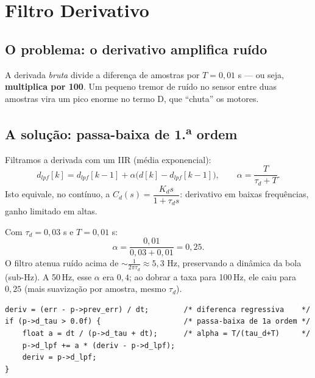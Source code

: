 \chapter{Filtro Derivativo}\label{cap:filtro}

\section{O problema: o derivativo amplifica ru\'ido}
A derivada \emph{bruta} divide a diferen\c{c}a de amostras por $T=0{,}01$ s --- ou
seja, \textbf{multiplica por 100}. Um pequeno tremor de ru\'ido no sensor entre
duas amostras vira um pico enorme no termo D, que ``chuta'' os motores.

\section{A solu\c{c}\~ao: passa-baixa de 1.\textsuperscript{a} ordem}
Filtramos a derivada com um IIR (m\'edia exponencial):
\begin{equation}
d_{lpf}[k]=d_{lpf}[k-1]+\alpha\big(d[k]-d_{lpf}[k-1]\big),
\qquad \alpha=\frac{T}{\tau_d+T}.
\end{equation}
Isto equivale, no cont\'inuo, a $C_d(s)=\dfrac{K_d s}{1+\tau_d s}$: derivativo em
baixas frequ\^encias, ganho limitado em altas.

\begin{exemplo}
Com $\tau_d=0{,}03$ s e $T=0{,}01$ s:
\[
\alpha=\frac{0{,}01}{0{,}03+0{,}01}=0{,}25.
\]
O filtro atenua ru\'ido acima de $\sim\!\frac{1}{2\pi\tau_d}\approx5{,}3$ Hz,
preservando a din\^amica da bola (sub-Hz). A 50\,Hz, esse $\alpha$ era $0{,}4$;
ao dobrar a taxa para 100\,Hz, ele caiu para $0{,}25$ (mais suaviza\c{c}\~ao por
amostra, mesmo $\tau_d$).
\end{exemplo}

\begin{lstlisting}[caption={Derivada filtrada em \texttt{main/pid.c} (n\'ucleo).},label={lst:deriv}]
deriv = (err - p->prev_err) / dt;        /* diferenca regressiva    */
if (p->d_tau > 0.0f) {                   /* passa-baixa de 1a ordem */
    float a = dt / (p->d_tau + dt);      /* alpha = T/(tau_d+T)     */
    p->d_lpf += a * (deriv - p->d_lpf);
    deriv = p->d_lpf;
}
\end{lstlisting}

